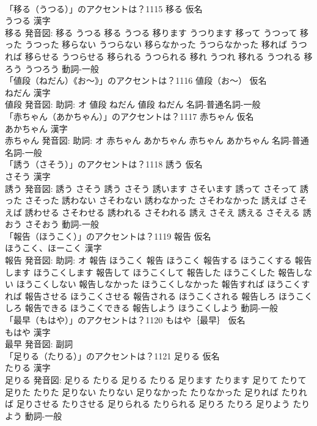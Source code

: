 \documentclass[8pt]{extreport}
\begin{document}
\begin{CJK}{UTF8}{min}
\\	「移る（うつる）」のアクセントは？1115	移る 仮名　
\\	うつる 漢字　
\\	移る 発音図:	移る うつる		移る うつる 移ります うつります 移って うつって 移った うつった 移らない うつらない 移らなかった うつらなかった 移れば うつれば 移らせる うつらせる 移られる うつられる 移れ うつれ 移れる うつれる 移ろう うつろう				動詞-一般 
\\	「値段（ねだん）《お〜》」のアクセントは？1116	値段（お〜） 仮名　
\\	ねだん 漢字　
\\	値段 発音図: 助詞: オ	値段 ねだん		値段 ねだん				名詞-普通名詞-一般 
\\	「赤ちゃん（あかちゃん）」のアクセントは？1117	赤ちゃん 仮名　
\\	あかちゃん 漢字　
\\	赤ちゃん 発音図: 助詞: オ	赤ちゃん あかちゃん		赤ちゃん あかちゃん				名詞-普通名詞-一般 
\\	「誘う（さそう）」のアクセントは？1118	誘う 仮名　
\\	さそう 漢字　
\\	誘う 発音図:	誘う さそう		誘う さそう 誘います さそいます 誘って さそって 誘った さそった 誘わない さそわない 誘わなかった さそわなかった 誘えば さそえば 誘わせる さそわせる 誘われる さそわれる 誘え さそえ 誘える さそえる 誘おう さそおう				動詞-一般 
\\	「報告（ほうこく）」のアクセントは？1119	報告 仮名　
\\	ほうこく、ほーこく 漢字　
\\	報告 発音図: 助詞: オ	報告 ほうこく		報告 ほうこく 報告する ほうこくする 報告します ほうこくします 報告して ほうこくして 報告した ほうこくした 報告しない ほうこくしない 報告しなかった ほうこくしなかった 報告すれば ほうこくすれば 報告させる ほうこくさせる 報告される ほうこくされる 報告しろ ほうこくしろ 報告できる ほうこくできる 報告しよう ほうこくしよう				動詞-一般 
\\	「最早（もはや）」のアクセントは？1120	もはや｛最早｝ 仮名　
\\	もはや 漢字　
\\	最早 発音図:							副詞 
\\	「足りる（たりる）」のアクセントは？1121	足りる 仮名　
\\	たりる 漢字　
\\	足りる 発音図:	足りる たりる		足りる たりる 足ります たります 足りて たりて 足りた たりた 足りない たりない 足りなかった たりなかった 足りれば たりれば 足りさせる たりさせる 足りられる たりられる 足りろ たりろ 足りよう たりよう				動詞-一般 

\end{CJK}
\end{document}
